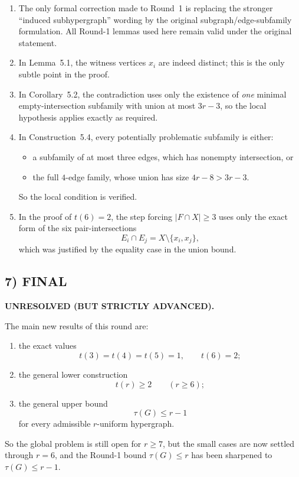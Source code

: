 \begin{enumerate}
\item The only formal correction made to Round~1 is replacing the stronger ``induced subhypergraph'' wording by the original subgraph/edge-subfamily formulation. All Round-1 lemmas used here remain valid under the original statement.
\item In Lemma~5.1, the witness vertices $x_i$ are indeed distinct; this is the only subtle point in the proof.
\item In Corollary~5.2, the contradiction uses only the existence of \emph{one} minimal empty-intersection subfamily with union at most $3r-3$, so the local hypothesis applies exactly as required.
\item In Construction~5.4, every potentially problematic subfamily is either:
\begin{itemize}
\item a subfamily of at most three edges, which has nonempty intersection, or
\item the full $4$-edge family, whose union has size $4r-8>3r-3$.
\end{itemize}
So the local condition is verified.
\item In the proof of $t(6)=2$, the step forcing $|F\cap X|\ge 3$ uses only the exact form of the six pair-intersections
\[
E_i\cap E_j=X\setminus\{x_i,x_j\},
\]
which was justified by the equality case in the union bound.
\end{enumerate}

\subsection*{7) FINAL}

\textbf{UNRESOLVED (BUT STRICTLY ADVANCED).}

The main new results of this round are:

\begin{enumerate}
\item the exact values
\[
t(3)=t(4)=t(5)=1,\qquad t(6)=2;
\]
\item the general lower construction
\[
t(r)\ge 2 \qquad (r\ge 6);
\]
\item the general upper bound
\[
\tau(G)\le r-1
\]
for every admissible $r$-uniform hypergraph.
\end{enumerate}

So the global problem is still open for $r\ge 7$, but the small cases are now settled through $r=6$, and the Round-1 bound $\tau(G)\le r$ has been sharpened to $\tau(G)\le r-1$.

